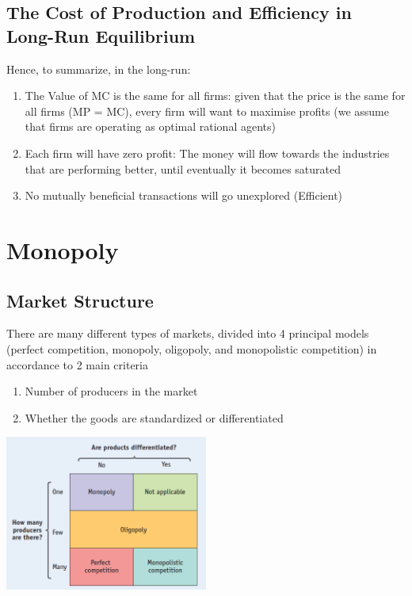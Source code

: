 \documentclass[english,course,draft]{Notes}
\begin{document}
\subsection{The Cost of Production and Efficiency in Long-Run Equilibrium}

\par{Hence, to summarize, in the long-run:}

\begin{enumerate}
	\item The Value of MC is the same for all firms: given that the price is the same for all firms (MP = MC), every firm will want to maximise profits (we assume that firms are operating as optimal rational agents)
	\item Each firm will have zero  profit: The money will flow towards the industries that are performing better, until eventually it becomes saturated
	\item No mutually beneficial transactions will go unexplored (Efficient)
\end{enumerate}

\section{Monopoly}

\subsection{Market Structure}

\par{There are many different types of markets, divided into 4 principal models (perfect competition, monopoly, oligopoly, and monopolistic competition) in accordance to 2 main criteria }

\begin{enumerate}
	\item Number of producers in the market
	\item Whether the goods are standardized or differentiated 
\end{enumerate}

\includegraphics[width=0.5\textwidth]{marketStrut}
\end{document}
